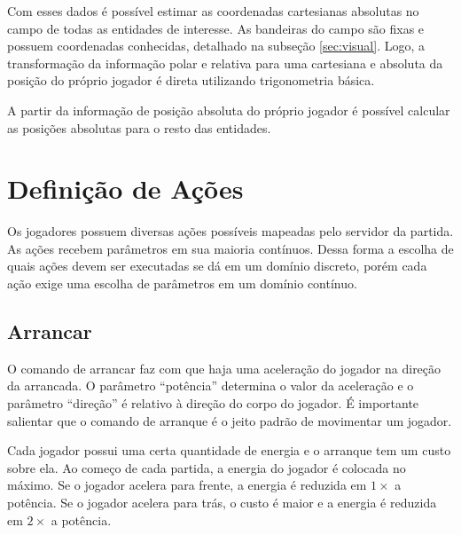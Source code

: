 \par Com esses dados é possível estimar as coordenadas cartesianas absolutas no campo de todas as entidades de interesse. As bandeiras do campo são fixas e possuem coordenadas conhecidas, detalhado na subseção \ref{sec:visual}. Logo, a transformação da informação polar e relativa para uma cartesiana e absoluta da posição do próprio jogador é direta utilizando trigonometria básica. 

\par A partir da informação de posição absoluta do próprio jogador é possível calcular as posições absolutas para o resto das entidades.



\section{Definição de Ações}

\par Os jogadores possuem diversas ações possíveis mapeadas pelo servidor da partida. As ações recebem parâmetros em sua maioria contínuos. Dessa forma a escolha de quais ações devem ser executadas se dá em um domínio discreto, porém cada ação exige uma escolha de parâmetros em um domínio contínuo.

\subsection{Arrancar}
\label{sec:dash}

O comando de arrancar faz com que haja uma aceleração do jogador na direção da arrancada. O parâmetro ``potência'' determina o valor da aceleração e o parâmetro ``direção'' é relativo à direção do corpo do jogador. É importante salientar que o comando de arranque é o jeito padrão de movimentar um jogador.

Cada jogador possui uma certa quantidade de energia e o arranque tem um custo sobre ela. Ao começo de cada partida, a energia do jogador é colocada no máximo. Se o jogador acelera para frente, a energia é reduzida em $1\times$ a potência. Se o jogador acelera para trás, o custo é maior e a energia é reduzida em $2\times$ a potência.

